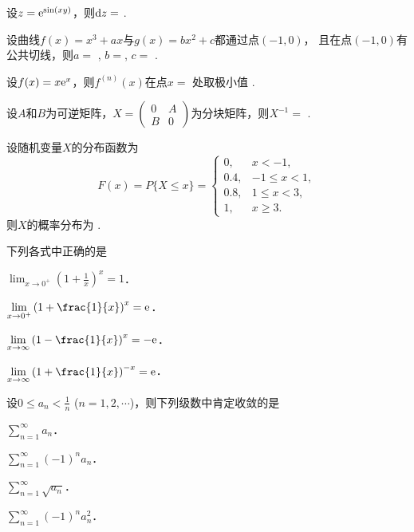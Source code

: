 \documentclass[plain,noanswer,medmath]{../../template/jnuexam}
\begin{document}




\begin{problem}
设$z = \mathrm{e}^{\sin(xy)}$，则$\mathop{}\!\mathrm{d} z=$ \fillin{}.
\end{problem}


\begin{problem}
设曲线$f(x) = x^3 + ax$与$g(x) = bx^2 + c$都通过点$(-1,0)$，
且在点$(-1,0)$有公共切线，则$a =$ \fillin{}, $b =$\fillin{}, $c =$ \fillin{}.
\end{problem}


\begin{problem}
设$f(x) = x\mathrm{e}^x$，则$f^{(n)}(x)$在点$x=$ \fillin{}处取极小值\fillin{} .
\end{problem}


\begin{problem}
设$A$和$B$为可逆矩阵，$X = \begin{pmatrix}
  0 & A \\
  B & 0
\end{pmatrix}$为分块矩阵，则$X^{-1} =$ \fillin{}.
\end{problem}


\begin{problem}
设随机变量$X$的分布函数为
$$F(x) = P\{X \le x\} = \begin{cases}
    0, & x < - 1, \\
  0.4, & -1 \le x < 1, \\
  0.8, & 1 \le x < 3, \\
    1, & x \ge 3.
\end{cases}$$
则$X$的概率分布为 \fillin{}.
\end{problem}




\begin{problem}
下列各式中正确的是\pickout{}
\begin{abcd}
\item $\lim_{x \to 0^+} \left(1 + \frac{1}{x} \right)^x = 1$．
\item $\lim_{x \to 0^+} \left(1 + \frac{1}{x} \right)^x = \e$．
\item $\lim_{x \to \infty} \left(1 - \frac{1}{x} \right)^x = -\e$．
\item $\lim_{x \to \infty} \left(1 + \frac{1}{x} \right)^{- x} = \e$．
\end{abcd}
\end{problem}


\begin{problem}
设$0 \le a_n < \frac{1}{n}$ ($n = 1,2, \cdots$)，则下列级数中肯定收敛的是\pickout{}
\begin{abcd}
\item $\sum_{n = 1}^{\infty}a_n$．
\item $\sum_{n = 1}^{\infty}(- 1)^n a_n$．
\item $\sum_{n = 1}^{\infty}\sqrt{a_n}$．
\item $\sum_{n = 1}^{\infty}(- 1)^n a_n^2$．
\end{abcd}
\end{problem}
\end{document}
